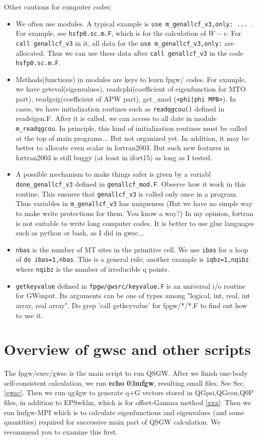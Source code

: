\documentclass[a4paper,10pt,epsf,fleqn]{article}
\newcommand{\exe}[1]{{\bf #1}}
\newcommand{\io}[1]{{\sf  #1}}
\newcommand{\raw}[1]{{\tt #1}}
\begin{document}
Other cautions for computer codes;
\begin{itemize}
\item 
We often use modules. A typical example is \verb#use m_genallcf_v3,only: ... #. For example, see \raw{hsfp0.sc.m.F}, which is for the calculation of $W-v$.
For \verb#call genallcf_v3# in it, all data for the 
\verb#use m_genallcf_v3,only:# are allocated. Thus we can use these data
after \verb#call genallcf_v3# in the code \raw{hsfp0.sc.m.F}.
\item
Methods(functions) in modules are keys to learn fpgw/ codes.
For example, we have geteval(eigenvalues), 
readcphi(coefficient of eigenfunction for MTO part),
readgeig(coefficient of APW part), get\_zmel (\verb#<phi|phi MPB>#).
In cases, we have initialization routines such as
\raw{readqgcou()} defined in \io{readeigen.F}.
After it is called, we can access to all date in module \verb#m_readqgcou#.
In principle, this kind of initialization routines must be called
at the top of main programs... But not organized yet.
In addition, it may be better to allocate even scalar in fortran2003.
But such new features in fortran2003 is still buggy
(at least in ifort15) as long as I tested.
\item
A possible mechanism to make things safer 
is given by a variabl \verb#done_genallcf_v3# defined in \verb#genallcf_mod.F#.
Observe how it work in this routine.
This ensures that \verb#genallcf_v3# is called only once in a program.
Thus variables in \verb#m_genallcf_v3# has uniqueness
(But we have no simple way to make write protections for them. 
You know a way?)
In my opinion, fortran is not suitable to write long computer codes.
It is better to use glue languages such as python or bash, as I did in gwsc...
\item
\verb#nbas# is the number of MT sites in the primitive cell.
We use \verb#ibas# for a loop of \verb#do ibas=1,nbas#.
This is a general rule; another example is \verb#iqbz=1,nqibz#
where \verb#nqibz# is the number of irreducible q points.
\item
\verb#getkeyvalue# defined in \verb#fpgw/gwsrc/keyvalue.F#
is an universal i/o routine for \io{GWinput}.
Its arguments can be one of types among 
"logical, int, real, int array, real array".
Do grep 'call getkeyvalue' for fpgw/*/*.F 
to find out how to use it.
\end{itemize}

\section{Overview of gwsc and other scripts}
The fpgw/exec/gwsc is the main script to run QSGW.
After we finish one-body self-consistent calculation, 
we run \exe{echo 0$|$lmfgw}, resulting small files.
See Sec.\ref{gwsc}. Then we run qg4gw to generate q+G vectors
stored in \io{QGpsi,QGcou,Q0P} files, in addition to EPSwklm, which is for offset-Gamma method \ref{xxx}.
Then we run lmfgw-MPI which is to calculate eigenfunctions
and eigenvalues (and some quantities) required for successive
main part of QSGW calculation.
We recommend you to examine this first.
\end{document}
